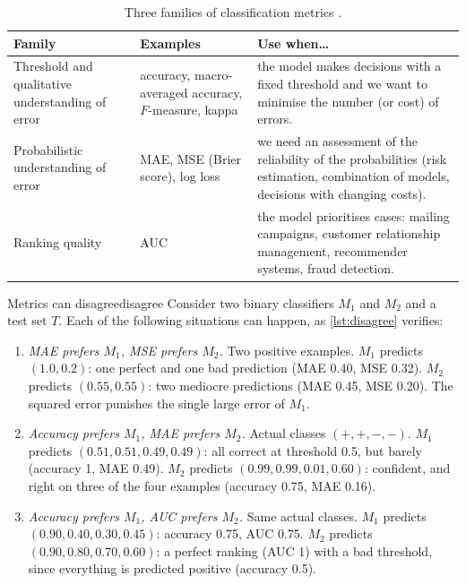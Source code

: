 \begin{table}[htbp]
\centering\small
\caption{Three families of classification metrics \citep{ferri2009experimental}.}\label{tab:taxonomy}
\begin{tabularx}{\textwidth}{@{}>{\raggedright\arraybackslash}p{3.2cm}>{\raggedright\arraybackslash}p{3.6cm}X@{}}
\toprule
Family & Examples & Use when\dots\\
\midrule
Threshold and qualitative understanding of error & accuracy, macro-averaged accuracy,
$F$-measure, kappa & the model makes decisions with a fixed threshold and we want to
minimise the number (or cost) of errors.\\
Probabilistic understanding of error & MAE, MSE (Brier score), log loss & we need an
assessment of the reliability of the probabilities (risk estimation, combination of models,
decisions with changing costs).\\
Ranking quality & AUC & the model prioritises cases: mailing campaigns, customer relationship
management, recommender systems, fraud detection.\\
\bottomrule
\end{tabularx}
\end{table}

\begin{example}{Metrics can disagree}{disagree}
Consider two binary classifiers $M_1$ and $M_2$ and a test set $T$. Each of the following
situations can happen, as \cref{lst:disagree} verifies:
\begin{enumerate}[label=(\alph*)]
  \item \emph{MAE prefers $M_1$, MSE prefers $M_2$.} Two positive examples. $M_1$ predicts
        $(1.0, 0.2)$: one perfect and one bad prediction (MAE 0.40, MSE 0.32). $M_2$ predicts
        $(0.55,0.55)$: two mediocre predictions (MAE 0.45, MSE 0.20). The squared error
        punishes the single large error of $M_1$.
  \item \emph{Accuracy prefers $M_1$, MAE prefers $M_2$.} Actual classes $(+,+,-,-)$. $M_1$
        predicts $(0.51,0.51,0.49,0.49)$: all correct at threshold 0.5, but barely (accuracy
        1, MAE 0.49). $M_2$ predicts $(0.99,0.99,0.01,0.60)$: confident, and right on three of the four examples (accuracy 0.75, MAE 0.16).
  \item \emph{Accuracy prefers $M_1$, AUC prefers $M_2$.} Same actual classes. $M_1$ predicts
        $(0.90,0.40,0.30,0.45)$: accuracy 0.75, AUC 0.75. $M_2$ predicts $(0.90,0.80,0.70,0.60)$:
        a perfect ranking (AUC 1) with a bad threshold, since everything is predicted
        positive (accuracy 0.5).
\end{enumerate}
\end{example}

